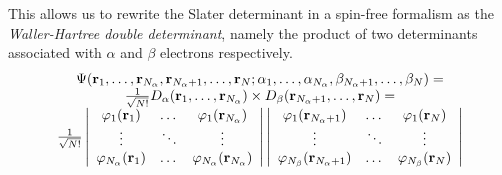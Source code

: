 \documentclass[./thesis.tex]{subfiles}
\begin{document}
This allows us to rewrite the Slater determinant in a spin-free formalism as
the \emph{Waller-Hartree double determinant},\cite{Pauncz_1989} namely the
product of two determinants associated with $\alpha$ and $\beta$ electrons
respectively.
\begin{equation}
\begin{array}{c}
 \Psi({\bf r}_1,\dots,{\bf r}_{{N_\alpha}},{\bf r}_{{N_\alpha}+1},\dots,{\bf r}_N;
      \alpha_1,\dots,\alpha_{{N_\alpha}},\beta_{{N_\alpha}+1},\dots,\beta_N) = \\
\frac{1}{\sqrt{N!}} D_\alpha({\bf r}_1,\dots,{\bf r}_{{N_\alpha}}) \times D_\beta({\bf r}_{{N_\alpha}+1},\dots,{\bf r}_N) = \\
\frac{1}{\sqrt{N!}} \left|
 \begin{array}{ccc}
 \varphi_1({\bf r}_1) & \dots & \varphi_1({\bf r}_{{N_\alpha}}) \\
 \vdots               & \ddots &   \vdots             \\
 \varphi_{{N_\alpha}}({\bf r}_1) & \dots & \varphi_{{N_\alpha}}({\bf r}_{{N_\alpha}}) \\
 \end{array}
\right|
\left|
 \begin{array}{ccc}
 \varphi_1({\bf r}_{{N_\alpha}+1}) & \dots & \varphi_1({\bf r}_{N}) \\
 \vdots               & \ddots &   \vdots             \\
 \varphi_{N_\beta}({\bf r}_{{N_\alpha}+1}) & \dots & \varphi_{N_\beta}({\bf r}_{N}) \\
 \end{array}
\right| \\ 
\end{array} \\
\label{eq:slater}
\end{equation}
\end{document}
